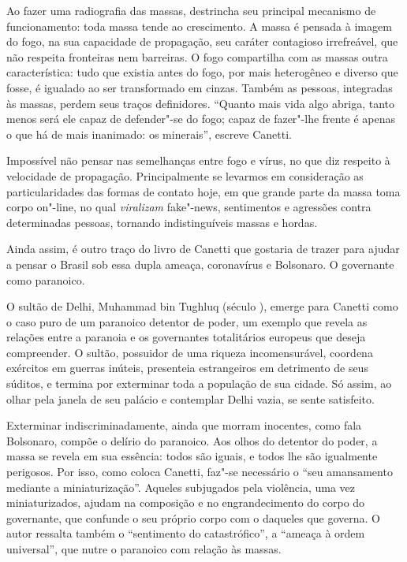Ao fazer uma radiografia das massas, destrincha seu principal mecanismo
de funcionamento: toda massa tende ao crescimento. A massa é pensada à
imagem do fogo, na sua capacidade de propagação, seu caráter contagioso
irrefreável, que não respeita fronteiras nem barreiras. O fogo
compartilha com as massas outra característica: tudo que existia antes
do fogo, por mais heterogêneo e diverso que fosse, é igualado ao ser
transformado em cinzas. Também as pessoas, integradas às massas, perdem
seus traços definidores. ``Quanto mais vida algo abriga, tanto menos
será ele capaz de defender"-se do fogo; capaz de fazer"-lhe frente é
apenas o que há de mais inanimado: os minerais'', escreve Canetti.

Impossível não pensar nas semelhanças entre fogo e vírus, no que diz
respeito à velocidade de propagação. Principalmente se levarmos em
consideração as particularidades das formas de contato hoje, em que
grande parte da massa toma corpo on"-line, no qual \emph{viralizam}
fake"-news, sentimentos e agressões contra determinadas pessoas, tornando
indistinguíveis massas e hordas.

Ainda assim, é outro traço do livro de Canetti que gostaria de trazer
para ajudar a pensar o Brasil sob essa dupla ameaça, coronavírus e
Bolsonaro. O governante como paranoico.

O sultão de Delhi, Muhammad bin Tughluq (século ), emerge para
Canetti como o caso puro de um paranoico detentor de poder, um exemplo
que revela as relações entre a paranoia e os governantes totalitários
europeus que deseja compreender. O sultão, possuidor de uma riqueza
incomensurável, coordena exércitos em guerras inúteis, presenteia
estrangeiros em detrimento de seus súditos, e termina por exterminar
toda a população de sua cidade. Só assim, ao olhar pela janela de seu
palácio e contemplar Delhi vazia, se sente satisfeito.

Exterminar indiscriminadamente, ainda que morram inocentes, como fala
Bolsonaro, compõe o delírio do paranoico. Aos olhos do detentor do
poder, a massa se revela em sua essência: todos são iguais, e todos lhe
são igualmente perigosos. Por isso, como coloca Canetti, faz"-se
necessário o ``seu amansamento mediante a miniaturização''. Aqueles
subjugados pela violência, uma vez miniaturizados, ajudam na composição
e no engrandecimento do corpo do governante, que confunde o seu próprio
corpo com o daqueles que governa. O autor ressalta também o ``sentimento
do catastrófico'', a ``ameaça à ordem universal'', que nutre o paranoico
com relação às massas.

